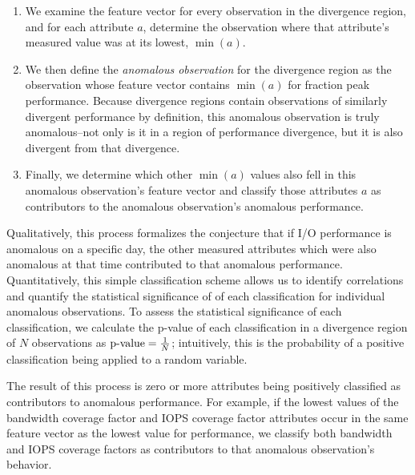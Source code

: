 \begin{enumerate}[leftmargin=*]

\item We examine the feature vector for every observation in the divergence region, and for each attribute $a$, determine the observation where that attribute's measured value was at its lowest, $\min(a)$.

\item We then define the \emph{anomalous observation} for the divergence region as the observation whose feature vector contains $\min(a)$ for fraction peak performance.
Because divergence regions contain observations of similarly divergent performance by definition, this anomalous observation is truly anomalous--not only is it in a region of performance divergence, but it is also divergent from that divergence.

\item Finally, we determine which other $\min(a)$ values also fell in this anomalous observation's feature vector and classify those attributes $a$ as contributors to the anomalous observation's anomalous performance.

\end{enumerate}

Qualitatively, this process formalizes the conjecture that if I/O performance is anomalous on a specific day, the other measured attributes which were also anomalous at that time contributed to that anomalous performance.
Quantitatively, this simple classification scheme allows us to identify correlations and quantify the statistical significance of of each classification for individual anomalous observations.
To assess the statistical significance of each classification, we calculate the p-value of each classification in a divergence region of $N$ observations as $\textup{p-value} = \frac{1}{N}$; intuitively, this is the probability of a positive classification being applied to a random variable.

The result of this process is zero or more attributes being positively classified as contributors to anomalous performance.
For example, if the lowest values of the bandwidth coverage factor and IOPS coverage factor attributes occur in the same feature vector as the lowest value for performance, we classify both bandwidth and IOPS coverage factors as contributors to that anomalous observation's behavior.


